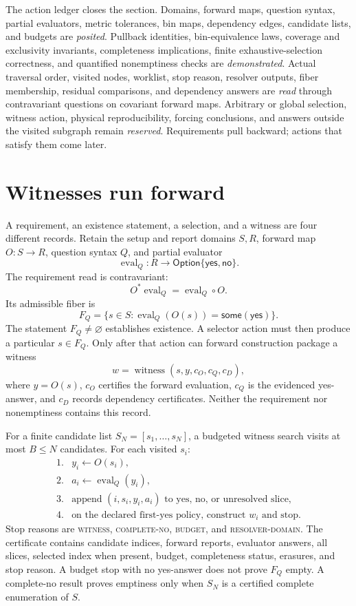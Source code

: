 The action ledger closes the section.  Domains, forward maps, question syntax, partial evaluators, metric tolerances,
bin maps, dependency edges, candidate lists, and budgets are \emph{posited}.  Pullback identities, bin-equivalence
laws, coverage and exclusivity invariants, completeness implications, finite exhaustive-selection correctness, and
quantified nonemptiness checks are \emph{demonstrated}.  Actual traversal order, visited nodes, worklist, stop reason,
resolver outputs, fiber membership, residual comparisons, and dependency answers are \emph{read} through
contravariant questions on covariant forward maps.  Arbitrary or global selection, witness action, physical
reproducibility, forcing conclusions, and answers
outside the visited subgraph remain \emph{reserved}.  Requirements pull backward; actions that satisfy them come later.

\section{Witnesses run forward}

A requirement, an existence statement, a selection, and a witness are four different records.  Retain the setup and
report domains \(S,R\), forward map \(O:S\to R\), question syntax \(Q\), and partial evaluator
\[
 \operatorname{eval}_Q:R\to
 \mathsf{Option}\{\mathsf{yes},\mathsf{no}\}.
\]
The requirement read is contravariant:
\[
                 O^*\operatorname{eval}_Q=\operatorname{eval}_Q\circ O.
\]
Its admissible fiber is
\[
 F_Q=\{s\in S:\operatorname{eval}_Q(O(s))
                    =\mathsf{some}(\mathsf{yes})\}.
\]
The statement \(F_Q\ne\varnothing\) establishes existence.  A selector action must then produce a particular
\(s\in F_Q\).  Only after that action can forward construction package a witness
\[
 w=\operatorname{witness}(s,y,c_O,c_Q,c_D),
\]
where \(y=O(s)\), \(c_O\) certifies the forward evaluation, \(c_Q\) is the evidenced yes-answer, and \(c_D\) records
dependency certificates.  Neither the requirement nor nonemptiness contains this record.

For a finite candidate list \(S_N=[s_1,\ldots,s_N]\), a budgeted witness search visits at most \(B\le N\) candidates.
For each visited \(s_i\):
\[
\begin{array}{ll}
1.&y_i\leftarrow O(s_i),\\
2.&a_i\leftarrow\operatorname{eval}_Q(y_i),\\
3.&\text{append }(i,s_i,y_i,a_i)\text{ to yes, no, or unresolved slice},\\
4.&\text{on the declared first-yes policy, construct }w_i\text{ and stop.}
\end{array}
\]
Stop reasons are \textsc{witness}, \textsc{complete-no}, \textsc{budget}, and \textsc{resolver-domain}.  The
certificate contains candidate indices, forward reports, evaluator answers, all slices, selected index when present,
budget, completeness status, erasures, and stop reason.  A budget stop with no yes-answer does not prove \(F_Q\) empty.
A complete-no result proves emptiness only when \(S_N\) is a certified complete enumeration of \(S\).

